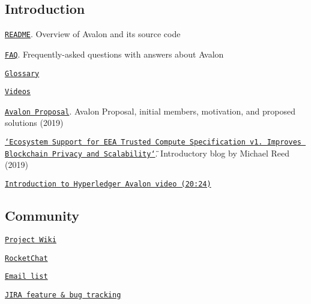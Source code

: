 \subsection*{Introduction}


\begin{DoxyItemize}
\item \href{https://github.com/hyperledger/avalon/blob/master/README.m%64}{\tt R\+E\+A\+D\+ME}. Overview of Avalon and its source code
\item \href{https://github.com/hyperledger/avalon/blob/master/docs//FAQ.rst}{\tt F\+AQ}. Frequently-\/asked questions with answers about Avalon
\begin{DoxyItemize}
\item \href{https://github.com/hyperledger/avalon/blob/master/docs//FAQ.rst#glossary}{\tt Glossary}
\item \href{https://github.com/hyperledger/avalon/blob/master/docs//FAQ.rst#videos}{\tt Videos}
\end{DoxyItemize}
\item \href{https://wiki.hyperledger.org/pages/viewpage.action?pageId=16324764}{\tt Avalon Proposal}. Avalon Proposal, initial members, motivation, and proposed solutions (2019)
\item \href{https://software.intel.com/en-us/articles/ecosystem-support-for-eea-trusted-compute-specification-v10-improves-blockchain-privacy-and}{\tt \char`\"{}\+Ecosystem Support for E\+E\+A Trusted Compute Specification v1. Improves Blockchain Privacy and Scalability\char`\"{}}. Introductory blog by Michael Reed (2019)
\item \href{https://youtu.be/YRXfzHzJVaU}{\tt Introduction to Hyperledger Avalon video (20\+:24)}
\end{DoxyItemize}

\href{https://youtu.be/YRXfzHzJVaU}{\tt }

\subsection*{Community}


\begin{DoxyItemize}
\item \href{https://wiki.hyperledger.org/display/avalon/Hyperledger+Avalon}{\tt Project Wiki}
\item \href{https://chat.hyperledger.org/channel/avalon}{\tt Rocket\+Chat}
\item \href{https://lists.hyperledger.org/g/avalon}{\tt Email list}
\item \href{https://jira.hyperledger.org/secure/RapidBoard.jspa?rapidView=241&view=planning.nodetail}{\tt J\+I\+RA feature \& bug tracking}
\end{DoxyItemize}

